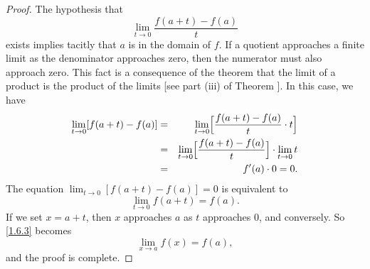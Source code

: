 \begin{proof}
The hypothesis that
$$
\lim_{t \rightarrow 0} {\frac{f(a + t) - f(a)}{t}}
$$
exists implies tacitly that $a$ is in the domain of $f$.
If a quotient approaches a finite limit as the denominator approaches zero,
then the numerator must also approach zero.
This fact is a consequence of the theorem that
the limit of a product is the product of the limits
[see part (iii) of Theorem ].
In this case, we have
\begin{eqnarray*}
\lim_{t \rightarrow 0} [f(a + t) - f(a)]
&=&  \lim_{t \rightarrow 0}
\Bigl[ {\frac{f(a + t) - f(a)}{t}} \cdot t \Bigr]  \\
&=&  \lim_{t \rightarrow 0}
\Bigl[ \frac {f(a + t) - f(a)}{t} \Bigr] \cdot \lim_{t \rightarrow 0} t \\
&=&  f'(a) \cdot 0 = 0 .
\end{eqnarray*}
The equation $\lim_{t \rightarrow 0} {[f(a + t) - f(a)]} = 0$
is equivalent to
\begin{equation}
\lim_{t \rightarrow 0} f(a + t) = f(a) .
\label{eq1.6.3}
\end{equation}
If we set $x = a + t$,
then $x$ approaches $a$ as $t$ approaches 0,
and conversely.
So \eqref{1.6.3} becomes
$$
\lim_{x \rightarrow a} f(x) = f(a) ,
$$
and the proof is complete.
\end{proof}
